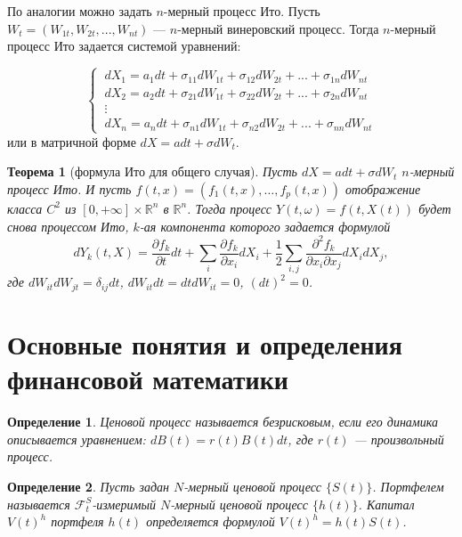 \documentclass[a4paper, 12pt]{extreport}
\newtheorem{theorem}{Теорема}
\newtheorem{definition}{Определение}
\numberwithin{equation}{section}
\begin{document}
	По аналогии можно задать $n$-мерный процесс Ито. Пусть $W_t = (W_{1t}, W_{2t},..., W_{nt})$ --- $n$-мерный винеровский процесс. Тогда $n$-мерный процесс Ито задается системой уравнений:
	
	\begin{equation*}	
	\begin{cases}
	\	dX_1 = a_1dt + \sigma_{11}dW_{1t} + \sigma_{12}dW_{2t} + ... + \sigma_{1n}dW_{nt}  
	\\ 
	\	dX_2=  a_2dt + \sigma_{21}dW_{1t} + \sigma_{22}dW_{2t} + ... + \sigma_{2n}dW_{nt} 
	\\
	\   \vdots
	\\
	\ dX_n=  a_ndt + \sigma_{n1}dW_{1t} + \sigma_{n2}dW_{2t} + ... + \sigma_{nn}dW_{nt}
	\end{cases}
	\end{equation*}
	или в матричной форме $dX = adt + \sigma dW_t$.
	
	\begin{theorem}	[формула Ито для общего случая]
		
		Пусть $dX = adt + \sigma dW_t$ $n$-мерный процесс Ито. И пусть $f(t,x) = (f_1(t,x), \dots, f_p(t,x))$ отображение класса $C^2$ из $[0, + \infty ] \times \mathbb{R}^n$ в $\mathbb{R}^n $. Тогда процесс $Y(t,\omega) = f(t,X(t))$ будет снова процессом Ито, $k$-ая компонента которого задается формулой $$dY_k(t,X) = \dfrac{\partial f_k}{\partial t} dt + \sum_i \dfrac{\partial f_k}{\partial x_i} dX_i + \frac{1}{2}\sum_{i,j} \dfrac{\partial^2 f_k}{\partial x_i\partial x_j} dX_idX_j,$$
		где $dW_{it}dW_{jt} = \delta_{ij}dt$, $dW_{it}dt=dtdW_{it} = 0$, $(dt)^2 = 0$.
	\end{theorem}
	
	\section{Основные понятия и определения финансовой математики}
	
	
	\begin{definition}
		Ценовой процесс называется безрисковым, если его динамика описывается уравнением: $dB(t)=r(t)B(t)dt$, где $r(t)$ --- произвольный процесс.
	\end{definition}
	
	
	\begin{definition}
		Пусть задан $N$-мерный ценовой процесс $\{S(t)\}$. Портфелем называется $\mathcal{F}_t^S$-измеримый $N$-мерный ценовой процесс $\{h(t)\}$. Капитал $V(t)^h$ портфеля $h(t)$ определяется формулой $V(t)^h=h(t)S(t)$. 
	\end{definition}
	
\end{document}
